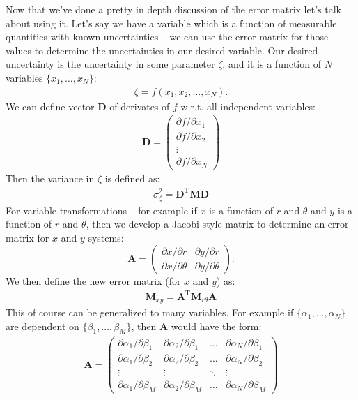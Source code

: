 \documentclass{article}
\newcommand{\vecb}[1]{\boldsymbol{\mathbf{#1}}}
\begin{document}
Now that we've done a pretty in depth discussion of the error matrix let's talk about using it. Let's say we have a variable which is a function of measurable quantities with known uncertainties -- we can use the error matrix for those values to determine the uncertainties in our desired variable. Our desired uncertainty is the uncertainty in some parameter $\zeta$, and it is a function of $N$ variables $\{x_1,\dotsc,x_N\}$:
\begin{align*}
  \zeta = f(x_1,x_2,\dotsc,x_N).
\end{align*}
We can define vector $\vecb{D}$ of derivates of $f$ w.r.t. all independent variables:
\begin{align}
  \vecb{D} = \begin{pmatrix}
    \partial f/\partial x_1 \\
    \partial f/\partial x_2 \\
    \vdots \\
    \partial f/\partial x_N
  \end{pmatrix}
\end{align}
Then the variance in $\zeta$ is defined as:
\begin{align}
  \sigma_{\zeta}^2 = \vecb{D}^{\mathrm{T}}\vecb{M}\vecb{D}
  \label{eq:non-transformed-variance}
\end{align}
For variable transformations -- for example if $x$ is a function of $r$ and $\theta$ and $y$ is a function of $r$ and $\theta$, then we develop a Jacobi style matrix to determine an error matrix for $x$ and $y$ systems:
\begin{equation}
  \vecb{A} = \begin{pmatrix}
    \partial x/\partial r      & \partial y/\partial r \\
    \partial x/\partial \theta & \partial y/\partial \theta 
  \end{pmatrix}.
\end{equation}
We then define the new error matrix (for $x$ and $y$) as:
\begin{align}
  \vecb{M}_{xy} = \vecb{A}^{\mathrm{T}}\vecb{M}_{r\theta}\vecb{A}
\end{align}
This of course can be generalized to many variables. For example if $\{\alpha_1,\dotsc,\alpha_N\}$ are dependent on $\{\beta_1,\dotsc,\beta_M\}$, then $\vecb{A}$ would have the form:
\begin{align}
  \vecb{A} = \begin{pmatrix}
    \partial\alpha_1/\partial\beta_1 & \partial\alpha_2/\partial\beta_1 & \ldots & \partial\alpha_N/\partial\beta_1 \\
    \partial\alpha_1/\partial\beta_2 & \partial\alpha_2/\partial\beta_2 & \ldots & \partial\alpha_N/\partial\beta_2 \\
    \vdots                           & \vdots                           & \ddots & \vdots                           \\
    \partial\alpha_1/\partial\beta_M & \partial\alpha_2/\partial\beta_M & \ldots & \partial\alpha_N/\partial\beta_M
  \end{pmatrix}
\end{align}
\end{document}
